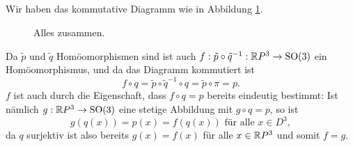 \documentclass[a4paper,10pt]{article}
\begin{document}
\subsection{}
Wir haben das kommutative Diagramm wie in Abbildung \ref{fig: alles zusammen}.
\begin{figure}\centering
 \caption{Alles zusammen.}
 \label{fig: alles zusammen}
\end{figure}
Da $\tilde{p}$ und $\tilde{q}$ Homöomorphismen sind ist auch $f : \tilde{p} \circ \tilde{q}^{-1} : \mathbb{R} P^3 \to \operatorname{SO}(3)$ ein Homöomorphismus, und da das Diagramm kommutiert ist
\[
 f \circ q
 = \tilde{p} \circ \tilde{q}^{-1} \circ q
 = \tilde{p} \circ \pi
 = p.
\]
$f$ ist auch durch die Eigenschaft, dass $f \circ q = p$ bereits eindeutig bestimmt: Ist nämlich $g : \mathbb{R} P^3 \to \operatorname{SO}(3)$ eine stetige Abbildung mit $g \circ q = p$, so ist
\[
 g(q(x)) = p(x) = f(q(x)) \text{ für alle } x \in D^3,
\]
da $q$ surjektiv ist also bereits $g(x) = f(x)$ für alle $x \in \mathbb{R} P^3$ und somit $f = g$.
\end{document}

